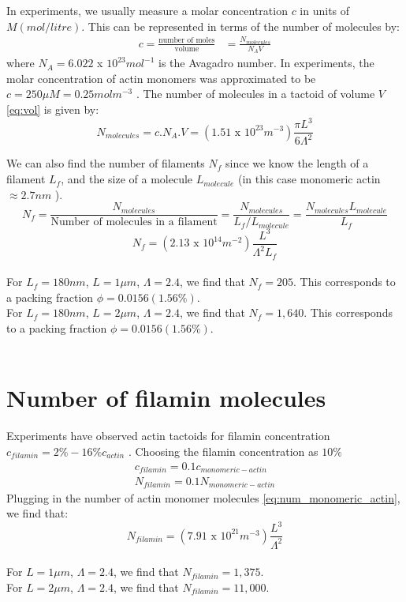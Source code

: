 \documentclass{article}[12pt]
\begin{document}
In experiments, we usually measure a molar concentration $c$ in units of $M (mol/litre)$. This can be represented in terms of the number of molecules by:
\begin{align*}
c = \frac{\text{number of moles}}{\text{volume}} &= \frac{N_{molecules}}{N_A V}
\end{align*} 
where $N_A = 6.022$ x $10^{23} mol^{-1}$ is the Avagadro number. In experiments, the molar concentration of actin monomers was approximated to be $c = 250 \mu M = 0.25 mol m^{-3}$ \cite{weirich2017liquid}. The number of molecules in a tactoid of volume $V$ \eqref{eq:vol} is given by:
\begin{equation}
N_{molecules} = c . N_A. V = (1.51 \text{ x } 10^{23} m^{-3}) \frac{\pi L^3}{6 \Lambda^2} \label{eq:num_monomeric_actin}
\end{equation}

We can also find the number of filaments $N_f$ since we know the length of a filament $L_f$, and the size of a molecule $L_{molecule}$ (in this case monomeric actin $\approx 2.7 nm$ \cite{weirich2017liquid}).
\begin{equation*}
N_f = \frac{N_{molecules}}{\text{Number of molecules in a filament}} = \frac{N_{molecules}}{L_f / L_{molecule}} = \frac{N_{molecules} L_{molecule}}{L_f}
\end{equation*}
\begin{equation}
N_f = (2.13 \text{ x } 10^{14} m^{-2}) \frac{L^3}{\Lambda^2 L_f} \label{eq:num_filament}
\end{equation}
\\
For $L_f = 180 nm$,  $L=1\mu m$, $\Lambda = 2.4$, we find that $N_f =205$. This corresponds to a packing fraction $\phi = 0.0156 (1.56 \%)$.\\
For $L_f = 180 nm$,  $L=2\mu m$, $\Lambda = 2.4$, we find that $N_f = 1,640$. This corresponds to a packing fraction $\phi = 0.0156 (1.56 \%)$. \\
\\

\section{Number of filamin molecules}

Experiments have observed actin tactoids for filamin concentration $c_{filamin} = 2\% - 16 \% c_{actin}$ \cite{weirich2017liquid}. Choosing the filamin concentration as $10\%$
\begin{align*}
c_{filamin} = 0.1 c_{monomeric-actin}\\
N_{filamin} = 0.1 N_{monomeric-actin}
\end{align*}
Plugging in the number of actin monomer molecules \eqref{eq:num_monomeric_actin}, we find that:
\begin{equation}
N_{filamin} = (7.91 \text{ x } 10^{21} m^{-3}) \frac{L^3}{\Lambda^2}
\end{equation}
\\
For $L=1\mu m$, $\Lambda = 2.4$, we find that $N_{filamin} = 1,375$.\\
For $L=2\mu m$, $\Lambda = 2.4$, we find that $N_{filamin} = 11,000$.\\
\end{document}
